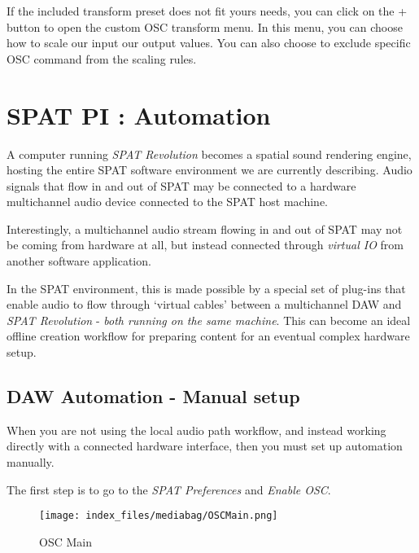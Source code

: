 \documentclass[
  letterpaper,
  DIV=11,
  numbers=noendperiod]{scrreport}
\begin{document}
If the included transform preset does not fit yours needs, you can click
on the + button to open the custom OSC transform menu. In this menu, you
can choose how to scale our input our output values. You can also choose
to exclude specific OSC command from the scaling rules.

\hypertarget{spat-pi-automation}{%
\chapter{SPAT PI : Automation}\label{spat-pi-automation}}

A computer running \emph{SPAT Revolution} becomes a spatial sound
rendering engine, hosting the entire SPAT software environment we are
currently describing. Audio signals that flow in and out of SPAT may be
connected to a hardware multichannel audio device connected to the SPAT
host machine.

Interestingly, a multichannel audio stream flowing in and out of SPAT
may not be coming from hardware at all, but instead connected through
\emph{virtual IO} from another software application.

In the SPAT environment, this is made possible by a special set of
plug-ins that enable audio to flow through `virtual cables' between a
multichannel DAW and \emph{SPAT Revolution} - \emph{both running on the
same machine}. This can become an ideal offline creation workflow for
preparing content for an eventual complex hardware setup.

\hypertarget{daw-automation---manual-setup}{%
\section{DAW Automation - Manual
setup}\label{daw-automation---manual-setup}}

When you are not using the local audio path workflow, and instead
working directly with a connected hardware interface, then you must set
up automation manually.

The first step is to go to the \emph{SPAT Preferences} and \emph{Enable
OSC}.

\begin{figure}

{\centering \texttt{[image: index\_files/mediabag/OSCMain.png]}

}

\caption{OSC Main}

\end{figure}
\end{document}
